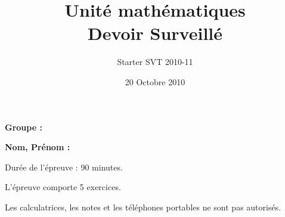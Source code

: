 




\title{Unité mathématiques \\ Devoir Surveillé}
\author{Starter SVT 2010-11}
\date{20 Octobre 2010}



\maketitle
\noindent\textbf{Groupe :}

\vspace{.5cm}

\noindent\textbf{Nom, Prénom :}

\vspace{1cm}

Durée de l'épreuve : 90 minutes. 

L'épreuve comporte 5 exercices.  

Les calculatrices, les notes et les téléphones portables ne sont pas autorisés.

\vspace{1cm}

%




\newpage


\newpage



\newpage



\newpage 





